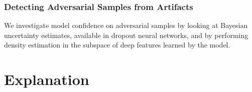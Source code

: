 \documentclass[10pt,a4paper]{article}
\begin{document}
\subsubsection{Detecting Adversarial Samples from Artifacts\cite{feinman2017detecting}}
We investigate model confidence on adversarial samples by looking at Bayesian uncertainty estimates, available in dropout neural networks, and by performing density estimation in the subspace of deep features learned by the model.
\section{Explanation}



\end{document}

